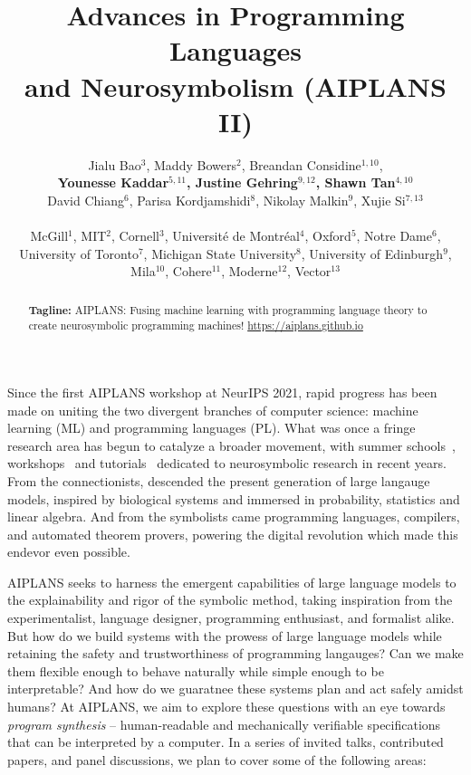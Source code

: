 \documentclass{article}
\title{Advances in Programming Languages\\ and Neurosymbolism (AIPLANS II)}
\author{%
  Jialu Bao$^3$, Maddy Bowers$^2$, Breandan Considine$^{1, 10}$, \\\textbf{Younesse Kaddar$^{5, 11}$, Justine Gehring$^{9, 12}$, Shawn Tan$^{4, 10}$} \\
    David Chiang$^6$, Parisa Kordjamshidi$^8$, Nikolay Malkin$^9$, Xujie Si$^{7, 13}$\\\\
    McGill$^1$, MIT$^2$, Cornell$^3$, Universit\'e de Montr\'eal$^4$, Oxford$^{5}$, Notre Dame$^6$,\\University of Toronto$^7$, Michigan State University$^8$, University of Edinburgh$^9$,\\Mila$^{10}$, Cohere$^{11}$, Moderne$^{12}$, Vector$^{13}$
}
\begin{document}
    \maketitle
    \vspace{-0.5cm}
    \begin{abstract}
        \textbf{Tagline:} AIPLANS: Fusing machine learning with programming language theory to create neurosymbolic programming machines! \url{https://aiplans.github.io} %
    \end{abstract}

   Since the first AIPLANS workshop at NeurIPS 2021, rapid progress has been made on uniting the two divergent branches of computer science: machine learning (ML) and programming languages (PL). What was once a fringe research area has begun to catalyze a broader movement, with summer schools~\cite{munawar2023neurosymbolic, costilla2024neurosymbolic}, workshops~\cite{besold2023nesy, belle2023neurosys, munawar2024neurosymbolic, llievski2024neurosymbolic} and tutorials~\cite{palangi2022tutorial, chaudhuri2023poplneurosym, shakarian2024tutorial} dedicated to neurosymbolic research in recent years. From the connectionists, descended the present generation of large langauge models, inspired by biological systems and immersed in probability, statistics and linear algebra. And from the symbolists came programming languages, compilers, and automated theorem provers, powering the digital revolution which made this endevor even possible.


    AIPLANS seeks to harness the emergent capabilities of large language models to the explainability and rigor of the symbolic method, taking inspiration from the experimentalist, language designer, programming enthusiast, and formalist alike. But how do we build systems with the prowess of large language models while retaining the safety and trustworthiness of programming langauges? Can we make them flexible enough to behave naturally while simple enough to be interpretable? And how do we guaratnee these systems plan and act safely amidst humans? At AIPLANS, we aim to explore these questions with an eye towards \textit{program synthesis} -- human-readable and mechanically verifiable specifications that can be interpreted by a computer. In a series of invited talks, contributed papers, and panel discussions, we plan to cover some of the following areas:
\end{document}
